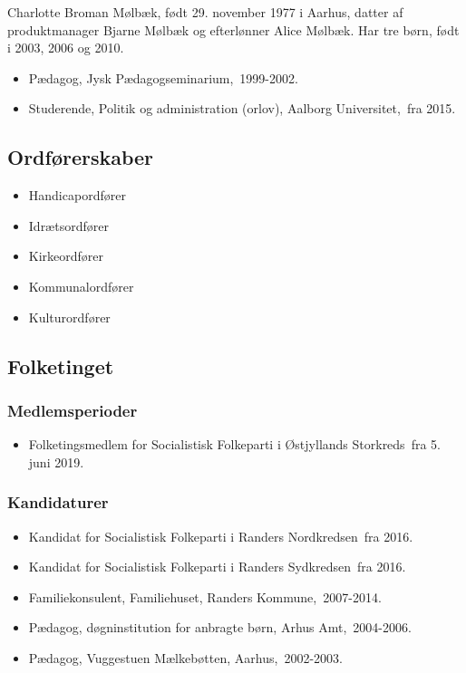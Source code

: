 \documentclass[11pt, a4paper]{awesome-cv}
\begin{document}
\makecvheader[R]
\makelettertitle
\begin{cvletter}
Charlotte Broman Mølbæk, født 29. november 1977 i Aarhus, datter af produktmanager Bjarne Mølbæk og efterlønner Alice Mølbæk. Har tre børn, født i 2003, 2006 og 2010.

\begin{itemize}
\item Pædagog, Jysk Pædagogseminarium, 1999-2002.
\item Studerende, Politik og administration (orlov), Aalborg Universitet, fra 2015.
\end{itemize}
\subsection*{Ordførerskaber}
\begin{itemize}
\item Handicapordfører
\item Idrætsordfører
\item Kirkeordfører
\item Kommunalordfører
\item Kulturordfører
\end{itemize}
\subsection*{Folketinget}
\subsubsection*{Medlemsperioder}
\begin{itemize}
\item Folketingsmedlem for Socialistisk Folkeparti i Østjyllands Storkreds fra 5. juni 2019.
\end{itemize}
\subsubsection*{Kandidaturer}
\begin{itemize}
\item Kandidat for Socialistisk Folkeparti i Randers Nordkredsen fra 2016.
\item Kandidat for Socialistisk Folkeparti i Randers Sydkredsen fra 2016.
\end{itemize}
\begin{itemize}
\item Familiekonsulent, Familiehuset, Randers Kommune, 2007-2014.
\item Pædagog, døgninstitution for anbragte børn, Arhus Amt, 2004-2006.
\item Pædagog, Vuggestuen Mælkebøtten, Aarhus, 2002-2003.
\end{itemize}
\end{cvletter}
\end{document}
